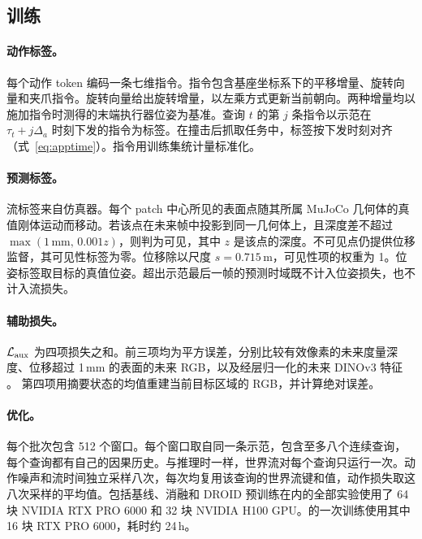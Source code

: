 \begin{table}[!htb]
\centering\footnotesize

\end{table}

\subsection{训练}
\label{app:training}
\paragraph{动作标签。}
每个动作 token 编码一条七维指令。指令包含基座坐标系下的平移增量、旋转向量和夹爪指令。旋转向量给出旋转增量，以左乘方式更新当前朝向。两种增量均以施加指令时测得的末端执行器位姿为基准。查询 $t$ 的第 $j$ 条指令以示范在 $\tau_t+j\Delta_a$ 时刻下发的指令为标签。在撞击后抓取任务中，标签按下发时刻对齐（式~\eqref{eq:apptime}）。指令用训练集统计量标准化。

\paragraph{预测标签。}
流标签来自仿真器。每个 patch 中心所见的表面点随其所属 MuJoCo 几何体的真值刚体运动而移动。若该点在未来帧中投影到同一几何体上，且深度差不超过 $\max(1\,\mathrm{mm},\,0.001z)$，则判为可见，其中 $z$ 是该点的深度。不可见点仍提供位移监督，其可见性标签为零。位移除以尺度 $s=0.715$\,m，可见性项的权重为 1。位姿标签取目标的真值位姿。超出示范最后一帧的预测时域既不计入位姿损失，也不计入流损失。

\paragraph{辅助损失。}
$\mathcal L_{\rm aux}$ 为四项损失之和。前三项均为平方误差，分别比较有效像素的未来度量深度、位移超过 1\,mm 的表面的未来 RGB，以及经层归一化的未来 DINOv3 特征 \cite{dinov3}。
第四项用摘要状态的均值重建当前目标区域的 RGB，并计算绝对误差。

\paragraph{优化。}
每个批次包含 512 个窗口。每个窗口取自同一条示范，包含至多八个连续查询，每个查询都有自己的因果历史。与推理时一样，世界流对每个查询只运行一次。动作噪声和流时间独立采样八次，每次均复用该查询的世界流键和值，动作损失取这八次采样的平均值。包括基线、消融和 DROID 预训练在内的全部实验使用了 64 块 NVIDIA RTX PRO 6000 和 32 块 NVIDIA H100 GPU。\ours 的一次训练使用其中 16 块 RTX PRO 6000，耗时约 24\,h。
